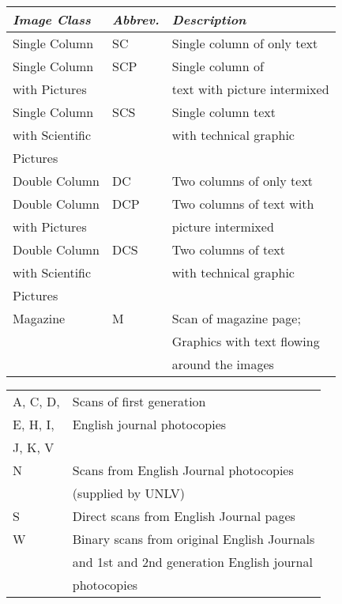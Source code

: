 \documentclass[conference]{IEEEtran}
\begin{document}
\begin{tabular}{|l|l|l|}
\hline
\textit{\textbf{Image Class}} & \textit{\textbf{Abbrev.}} & \textit{\textbf{Description}} \\ \hline
    Single Column & SC & Single column of only text \\ \hline
    Single Column & SCP & Single column of \\
    with Pictures &     & text with picture intermixed \\ \hline
    Single Column & SCS & Single column text \\
     with Scientific &  & with technical graphic   \\
     Pictures &  & \\ \hline
    Double Column & DC & Two columns of only text \\  \hline
    Double Column & DCP & Two columns of text with \\ 
    with Pictures &     & picture intermixed \\  \hline
    Double Column  & DCS & Two columns of text \\
    with Scientific &     &  with technical graphic  \\ 
     Pictures &  & \\ \hline
    Magazine & M & Scan of magazine page; \\
             &   & Graphics with text flowing \\
             &   & around the images \\
\hline
\end{tabular}
\label{table:Winder Image Classes}

\begin{tabular}{|l|l|}
\hline
    A, C, D,   & Scans of first generation  \\
    E, H, I,   & English journal photocopies \\ 
    J, K, V    & \\ \hline
    N & Scans from English Journal photocopies \\ 
      & (supplied by UNLV) \\ \hline
    S & Direct scans from English Journal pages \\ \hline
    W & Binary scans from original English Journals \\
      & and 1st and 2nd generation English journal \\
      & photocopies \\ \hline
\hline
\end{tabular}
\label{table:UW-III Image Classes}
\end{document}
